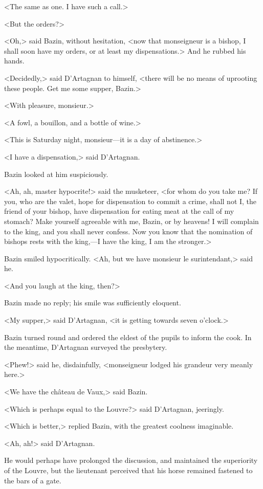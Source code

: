 <The same as one. I have such a call.>

<But the orders?>

<Oh,> said Bazin, without hesitation, <now that monseigneur is a bishop, I shall soon have my orders, or at least my dispensations.> And he rubbed his hands.

<Decidedly,> said D'Artagnan to himself, <there will be no means of uprooting these people. Get me some supper, Bazin.>

<With pleasure, monsieur.>

<A fowl, a bouillon, and a bottle of wine.>

<This is Saturday night, monsieur—it is a day of abstinence.>

<I have a dispensation,> said D'Artagnan.

Bazin looked at him suspiciously.

<Ah, ah, master hypocrite!> said the musketeer, <for whom do you take me? If you, who are the valet, hope for dispensation to commit a crime, shall not I, the friend of your bishop, have dispensation for eating meat at the call of my stomach? Make yourself agreeable with me, Bazin, or by heavens! I will complain to the king, and you shall never confess. Now you know that the nomination of bishops rests with the king,—I have the king, I am the stronger.>

Bazin smiled hypocritically. <Ah, but we have monsieur le surintendant,> said he.

<And you laugh at the king, then?>

Bazin made no reply; his smile was sufficiently eloquent.

<My supper,> said D'Artagnan, <it is getting towards seven o'clock.>

Bazin turned round and ordered the eldest of the pupils to inform the cook. In the meantime, D'Artagnan surveyed the presbytery.

<Phew!> said he, disdainfully, <monseigneur lodged his grandeur very meanly here.>

<We have the château de Vaux,> said Bazin.

<Which is perhaps equal to the Louvre?> said D'Artagnan, jeeringly.

<Which is better,> replied Bazin, with the greatest coolness imaginable.

<Ah, ah!> said D'Artagnan.

He would perhaps have prolonged the discussion, and maintained the superiority of the Louvre, but the lieutenant perceived that his horse remained fastened to the bars of a gate.


